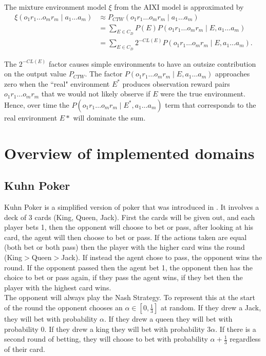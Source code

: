 \documentclass{article}
\theoremstyle{definition}
\newtheorem{primary statistics}[definition]{Primary Statistics}
\newtheorem{auxiliary statistics}[definition]{Auxiliary Statistics}
\begin{document}
The mixture environment model $\xi$ from the AIXI model is approximated by 
\begin{equation} \label{eq1}
\begin{split}
\xi (o_1r_1 \ldots o_mr_m \mid a_1 \ldots a_m) &\approx  P_{CTW}(o_1r_1 \ldots o_mr_m \mid a_1 \ldots a_m) \\
 & = \sum_{E \in C_D} P(E) P(o_1r_1 \ldots o_mr_m \mid E, a_1 \ldots a_m) \\ 
 & = \sum_{E \in C_D} 2^{-CL(E)} P(o_1r_1 \ldots o_mr_m \mid E, a_1 \ldots a_m).
\end{split}
\end{equation}

The $2^{-CL(E)}$ factor causes simple environments to have an outsize contribution on the output value $P_{CTW}$. The factor $P(o_1r_1 \ldots o_mr_m \mid E, a_1 \ldots a_m)$ approaches zero when the ``real" environment $E^*$ produces observation reward pairs $o_1r_1 \ldots o_mr_m$ that we would not likely observe if $E$ were the true environment. Hence, over time the $P(o_1r_1 \ldots o_mr_m \mid E^*, a_1 \ldots a_m)$ term that corresponds to the real environment $E*$ will dominate the sum. 


\section{Overview of implemented domains}
\subsection{Kuhn Poker}
Kuhn Poker is a simplified version of poker that was introduced in \citep{kuhn1950simplified}. It involves a deck of 3 cards (King, Queen, Jack). First the cards will be given out, and each player bets 1, then the opponent will choose to bet or pass, after looking at his card, the agent will then choose to bet or pass. If the actions taken are equal (both bet or both pass) then the player with the higher card wins the round (King$>$Queen$>$Jack). If instead the agent chose to pass, the opponent wins the round. If the opponent passed then the agent bet 1, the opponent then has the choice to bet or pass again, if they pass the agent wins, if they bet then the player with the highest card wins. \\

The opponent will always play the Nash Strategy. To represent this at the start of the round the opponent chooses an $\alpha\in [0,\frac{1}{3}]$ at random. If they drew a Jack, they will bet with probability $\alpha$. If they drew a queen they will bet with probability 0. If they drew a king they will bet with probability $3\alpha$. If there is a second round of betting, they will choose to bet with probability $\alpha+\frac{1}{3}$ regardless of their card. \\
\end{document}
